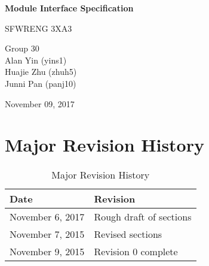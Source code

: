 \documentclass[12,english]{article}
\begin{document}
\begin{titlepage}
    \begin{center}
        \vspace*{1cm}
        
        \Huge
        \textbf{Module Interface Specification}
        
        \vspace{0.5cm}
        \LARGE
        SFWRENG 3XA3
        
        \vspace{1.5cm}
        
\Large
        Group 30
		\\ Alan Yin (yins1)
		\\ Huajie Zhu (zhuh5)
		\\ Junni Pan (panj10)
        
        \vspace{1.5cm}
        
        \Large
        November 09, 2017
        
    \end{center}
\end{titlepage}

\newpage
\tableofcontents
\listoftables
\listoffigures

\newpage
\section{Major Revision History}
\begin{table}[!htbp]
	\begin{tabular}{|l|l|}
	    \hline
		Date & Revision\\ \hline
		November 6, 2017 & Rough draft of sections\\ \hline
		November 7, 2015 & Revised sections \\ \hline
		November 9, 2015 & Revision 0 complete\\ \hline
	\end{tabular}
	\caption{Major Revision History}
\end{table}
\end{document}
